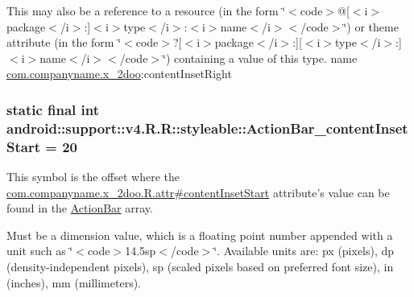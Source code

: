 This may also be a reference to a resource (in the form \char`\"{}$<$code$>$@\mbox{[}$<$i$>$package$<$/i$>$:\mbox{]}$<$i$>$type$<$/i$>$:$<$i$>$name$<$/i$>$$<$/code$>$\char`\"{}) or theme attribute (in the form \char`\"{}$<$code$>$?\mbox{[}$<$i$>$package$<$/i$>$:\mbox{]}\mbox{[}$<$i$>$type$<$/i$>$:\mbox{]}$<$i$>$name$<$/i$>$$<$/code$>$\char`\"{}) containing a value of this type.  name \hyperlink{namespacecom_1_1companyname_1_1x__2doo}{com.companyname.x\_\-2doo}:contentInsetRight \hypertarget{classandroid_1_1support_1_1v4_1_1_r_1_1styleable_4b97a1950d9a8efde8b222a7b18c7301}{
\subsubsection[{ActionBar\_\-contentInsetStart}]{\setlength{\rightskip}{0pt plus 5cm}static final int android::support::v4.R.R::styleable::ActionBar\_\-contentInsetStart = 20}}
\label{classandroid_1_1support_1_1v4_1_1_r_1_1styleable_4b97a1950d9a8efde8b222a7b18c7301}


This symbol is the offset where the \hyperlink{classcom_1_1companyname_1_1x__2doo_1_1_r_1_1attr_05ae6bcbd33b64b9f8c45fb31e7ed017}{com.companyname.x\_\-2doo.R.attr\#contentInsetStart} attribute's value can be found in the \hyperlink{classandroid_1_1support_1_1v4_1_1_r_1_1styleable_5c6cf2c83551ebae05f365bb913fdddf}{ActionBar} array.

Must be a dimension value, which is a floating point number appended with a unit such as \char`\"{}$<$code$>$14.5sp$<$/code$>$\char`\"{}. Available units are: px (pixels), dp (density-independent pixels), sp (scaled pixels based on preferred font size), in (inches), mm (millimeters). 

